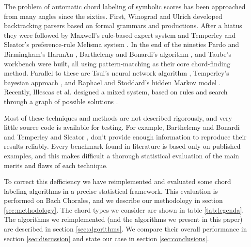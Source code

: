 \documentclass{article}
\begin{document}
The problem of automatic chord labeling of symbolic scores has been
approached from many angles since the sixties. First, Winograd
\cite{winograd68:linguistics} and Ulrich \cite{ulrich77:analysis}
developed backtracking parsers based on formal grammars and
productions. After a hiatus they were followed by Maxwell's
\cite{maxwell92:expert} rule-based expert system and Temperley and
Sleator's preference-rule Melisma system
\cite{temperley.ea99:modeling}. In the end of the nineties Pardo and
Birmingham's HarmAn \cite{pardo.ea02:algorithms}, Barthelemy and
Bonardi's algorithm \cite{barthelemy.ea01:figured}, and Taube's
workbench \cite{taube99:automatic} were built, all using
pattern-matching as their core chord-finding method. Parallel to these
are Tsui's neural network algorithm \cite{tsui02:harmonic},
Temperley's bayesian approach \cite{temperley04:bayesian}, and Raphael
and Stoddard's hidden Markov model \cite{raphael.ea03:harmonic}.
Recently, Illescas et al. designed a mixed system, based on rules and
search through a graph of possible solutions
\cite{illescas.ea07:harmonic}.

Most of these techniques and methods are not described rigorously, and
very little source code is available for testing. For example,
Barthelemy and Bonardi \cite{pardo.ea02:algorithms} and Temperley and
Sleator \cite{temperley.ea99:modeling}, don't provide enough
information to reproduce their results reliably. Every benchmark found
in literature \cite{pardo.ea00:automated, pardo.ea02:algorithms,
  tsui02:harmonic, taube99:automatic, illescas.ea07:harmonic} is based
only on published examples, and this makes difficult a thorough
statistical evaluation of the main merits and flaws of each technique.

To correct this defficiency we have reimplemented and evaluated some
chord labeling algorithms in a precise statistical framework. This
evaluation is performed on Bach Chorales, and we describe our
methodology in section \ref{sec:methodology}. The chord types we
consider are shown in table \ref{tab:legenda}. The algorithms we
reimplemented (and the algorithms we present in this paper) are
described in section \ref{sec:algorithms}. We compare their overall
performance in section \ref{sec:discussion} and state our case in
section \ref{sec:conclusions}.
\end{document}
